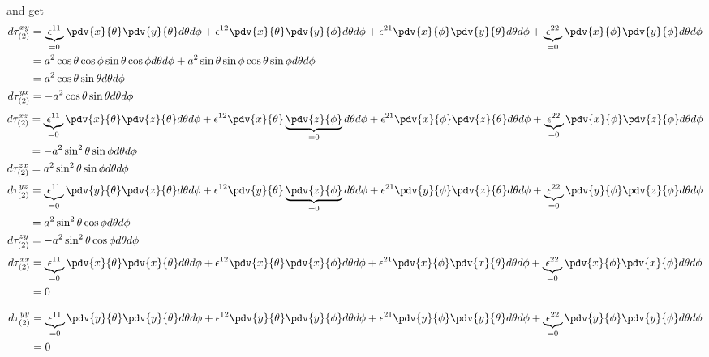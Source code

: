and get 
\begin{align}
d\tau_{(2)}^{xy}&= \underbrace{\epsilon^{11}}_{=0}\pdv{x}{\theta}\pdv{y}{\theta}d{\theta}d{\phi}+\epsilon^{12}\pdv{x}{\theta}\pdv{y}{\phi}d{\theta}d{\phi}+\epsilon^{21}\pdv{x}{\phi}\pdv{y}{\theta}d{\theta}d{\phi}+\underbrace{\epsilon^{22}}_{=0}\pdv{x}{\phi}\pdv{y}{\phi}d{\theta}d{\phi}\\
&=a^2\cos{\theta}\cos{\phi}\sin{\theta}\cos{\phi}d{\theta}d{\phi}
+a^2\sin{\theta}\sin{\phi}\cos{\theta}\sin{\phi}d{\theta}d{\phi}\\
&=a^2\cos{\theta}\sin{\theta}d{\theta}d{\phi}\\
d\tau_{(2)}^{yx}&=-a^2\cos{\theta}\sin{\theta}d{\theta}d{\phi}
\end{align}
\begin{align}
d\tau_{(2)}^{xz}&= \underbrace{\epsilon^{11}}_{=0}\pdv{x}{\theta}\pdv{z}{\theta}d{\theta}d{\phi}+\epsilon^{12}\pdv{x}{\theta}\underbrace{\pdv{z}{\phi}}_{=0}d{\theta}d{\phi}+\epsilon^{21}\pdv{x}{\phi}\pdv{z}{\theta}d{\theta}d{\phi}+\underbrace{\epsilon^{22}}_{=0}\pdv{x}{\phi}\pdv{z}{\phi}d{\theta}d{\phi}\\
&=-a^2\sin^2{\theta}\sin{\phi}d{\theta}d{\phi}\\
d\tau_{(2)}^{zx}&=a^2\sin^2{\theta}\sin{\phi}d{\theta}d{\phi}
\end{align}
\begin{align}
d\tau_{(2)}^{yz}&= \underbrace{\epsilon^{11}}_{=0}\pdv{y}{\theta}\pdv{z}{\theta}d{\theta}d{\phi}+\epsilon^{12}\pdv{y}{\theta}\underbrace{\pdv{z}{\phi}}_{=0}d{\theta}d{\phi}+\epsilon^{21}\pdv{y}{\phi}\pdv{z}{\theta}d{\theta}d{\phi}+\underbrace{\epsilon^{22}}_{=0}\pdv{y}{\phi}\pdv{z}{\phi}d{\theta}d{\phi}\\
&=a^2\sin^2{\theta}\cos{\phi}d{\theta}d{\phi}\\
d\tau_{(2)}^{zy}&=-a^2\sin^2{\theta}\cos{\phi}d{\theta}d{\phi}
\end{align}
\begin{align}
d\tau_{(2)}^{xx}&= \underbrace{\epsilon^{11}}_{=0}\pdv{x}{\theta}\pdv{x}{\theta}d{\theta}d{\phi}+\epsilon^{12}\pdv{x}{\theta}\pdv{x}{\phi}d{\theta}d{\phi}+\epsilon^{21}\pdv{x}{\phi}\pdv{x}{\theta}d{\theta}d{\phi}+\underbrace{\epsilon^{22}}_{=0}\pdv{x}{\phi}\pdv{x}{\phi}d{\theta}d{\phi}\\
&=0
\end{align}

\begin{align}
d\tau_{(2)}^{yy}&= \underbrace{\epsilon^{11}}_{=0}\pdv{y}{\theta}\pdv{y}{\theta}d{\theta}d{\phi}+\epsilon^{12}\pdv{y}{\theta}\pdv{y}{\phi}d{\theta}d{\phi}+\epsilon^{21}\pdv{y}{\phi}\pdv{y}{\theta}d{\theta}d{\phi}+\underbrace{\epsilon^{22}}_{=0}\pdv{y}{\phi}\pdv{y}{\phi}d{\theta}d{\phi}\\
&=0
\end{align}

